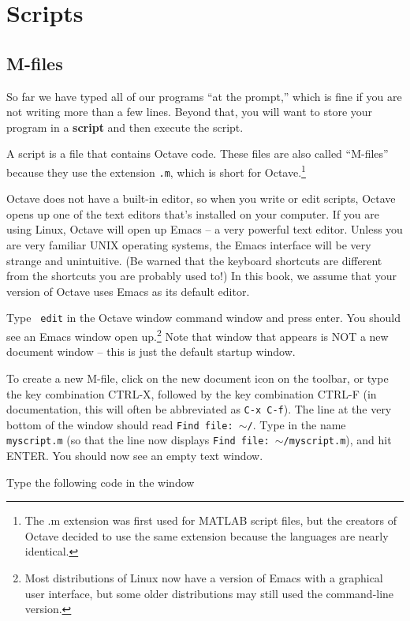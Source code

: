 \documentclass{book}
\begin{document}
\chapter{Scripts}

\section{M-files}

So far we have typed all of our programs ``at the prompt,'' which is
fine if you are not writing more than a few lines. Beyond that,
you will want to store your program in a {\bf script} and then
execute the script.

A script is a file that contains Octave code. These files are
also called ``M-files'' because they use the extension {\tt .m},
which is short for Octave.\footnote{The .m extension was first used for MATLAB
script files, but the creators of Octave decided to use the same extension
because the languages are nearly identical.}

Octave does not have a built-in editor, so when you write or edit scripts,
Octave opens up one of the text editors that's installed on your computer. If
you are using Linux, Octave will open up Emacs -- a very powerful text editor.
Unless you are very familiar UNIX operating systems, the Emacs interface will be
very strange and unintuitive. (Be warned that the keyboard shortcuts are
different from the shortcuts you are probably used to!) In this book, we assume
that your version of Octave uses Emacs as its default editor.

Type {\tt
edit} in the Octave window command window and press enter. You should see an
Emacs window open up.\footnote{Most distributions of Linux now have a version of
Emacs with a graphical user interface, but some older distributions may still
used the command-line version.} Note that window that appears is NOT a new
document window -- this is just the default startup window.

To create a new M-file, click on the new document icon on the
toolbar, or type the key combination CTRL-X,
followed by the key combination CTRL-F (in documentation, this will often be
abbreviated as {\tt C-x C-f}). The line at the very bottom of the window should
read {\tt Find file: $\sim$/}. Type in the name {\tt myscript.m} (so that the
line now displays {\tt Find file: $\sim$/myscript.m}), and hit ENTER. You
should now see an empty text window.

Type the following code in the window
\end{document}
